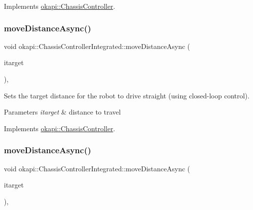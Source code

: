 Implements \mbox{\hyperlink{classokapi_1_1ChassisController_a58619e777fd1b3f8e1aae871d46a8ccf}{okapi\+::\+Chassis\+Controller}}.

\mbox{\label{classokapi_1_1ChassisControllerIntegrated_afc97bc450a090d91b57bc6353b4a6972}} 
\subsubsection{\texorpdfstring{moveDistanceAsync()}{moveDistanceAsync()}\hspace{0.1cm}{\footnotesize\ttfamily [1/2]}}
{\footnotesize\ttfamily void okapi\+::\+Chassis\+Controller\+Integrated\+::move\+Distance\+Async (\begin{DoxyParamCaption}\item[{Q\+Length}]{itarget }\end{DoxyParamCaption})\hspace{0.3cm}{\ttfamily [override]}, {\ttfamily [virtual]}}

Sets the target distance for the robot to drive straight (using closed-\/loop control).


\begin{DoxyParams}{Parameters}
{\em itarget} & distance to travel \\
\hline
\end{DoxyParams}


Implements \mbox{\hyperlink{classokapi_1_1ChassisController_a67a17268b871a4f1ae74d67891cbf5dd}{okapi\+::\+Chassis\+Controller}}.

\mbox{\label{classokapi_1_1ChassisControllerIntegrated_ab3cb8eb0c7d5162aafffe8b8ec2751d5}} 
\subsubsection{\texorpdfstring{moveDistanceAsync()}{moveDistanceAsync()}\hspace{0.1cm}{\footnotesize\ttfamily [2/2]}}
{\footnotesize\ttfamily void okapi\+::\+Chassis\+Controller\+Integrated\+::move\+Distance\+Async (\begin{DoxyParamCaption}\item[{double}]{itarget }\end{DoxyParamCaption})\hspace{0.3cm}{\ttfamily [override]}, {\ttfamily [virtual]}}

